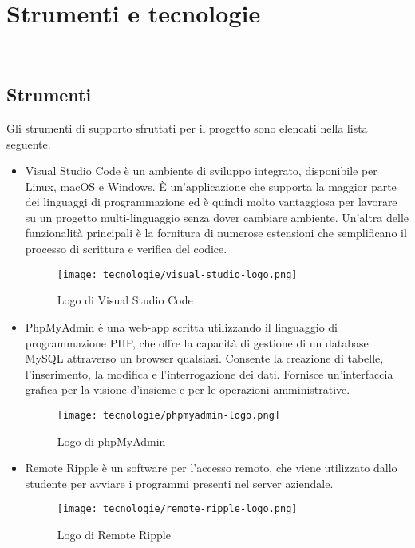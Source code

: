 \chapter{Strumenti e tecnologie}
\label{cap:strumenti-tecnologie}

\\

\section{Strumenti}
\label{sec:strumenti}
Gli strumenti di supporto sfruttati per il progetto sono elencati nella lista seguente.

\begin{itemize}
    \item Visual Studio Code è un ambiente di sviluppo integrato, disponibile per Linux, macOS e Windows. 
    È un'applicazione che supporta la maggior parte dei linguaggi di programmazione ed è quindi molto vantaggiosa per lavorare su un progetto multi-linguaggio senza dover cambiare ambiente.
    Un'altra delle funzionalità principali è la fornitura di numerose estensioni che semplificano il processo di scrittura e verifica del codice.

    \begin{figure}[!h] 
        \centering 
        \texttt{[image: tecnologie/visual-studio-logo.png]} 
        \caption{Logo di Visual Studio Code}
      \end{figure}

\newpage

    \item PhpMyAdmin è una web-app scritta utilizzando il linguaggio di programmazione PHP, che offre la capacità di gestione di un database MySQL attraverso un browser qualsiasi. Consente la creazione di tabelle, l'inserimento, la modifica e l'interrogazione dei dati.
    Fornisce un'interfaccia grafica per la visione d'insieme e per le operazioni amministrative.

    \begin{figure}[!h] 
        \centering 
        \texttt{[image: tecnologie/phpmyadmin-logo.png]} 
        \caption{Logo di phpMyAdmin}
      \end{figure}

    
    \item Remote Ripple è un software per l'accesso remoto, che viene utilizzato dallo studente per avviare i programmi presenti nel server aziendale.
    
    \begin{figure}[!h] 
        \centering 
        \texttt{[image: tecnologie/remote-ripple-logo.png]} 
        \caption{Logo di Remote Ripple}
      \end{figure}

\end{itemize}

